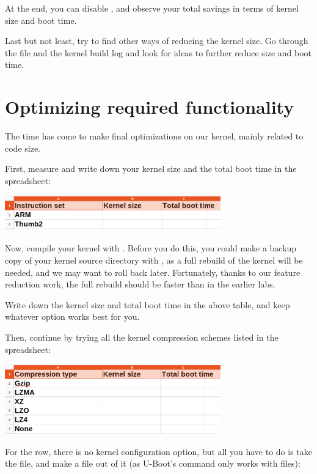 At the end, you can disable , and observe your
total savings in terms of kernel size and boot time.

Last but not least, try to find other ways of reducing the kernel size.
Go through the  file and the kernel build log and look for
ideas to further reduce size and boot time.

\section{Optimizing required functionality}

The time has come to make final optimizations on our kernel, mainly
related to code size.

First, measure and write down your kernel size and the total boot time
in the  spreadsheet:

\includegraphics[width=0.7\textwidth]{labs/boot-time-kernel/kernel-size-arm-thumb2.png}

Now, compile your kernel with . Before you do
this, you could make a backup copy of your kernel source directory with
, as a full rebuild of the kernel will be needed, and we
may want to roll back later. Fortunately, thanks to our feature
reduction work, the full rebuild should be faster than in the earlier labs.

Write down the kernel size and total boot time in the above table,
and keep whatever option works best for you.

Then, continue by trying all the kernel compression schemes listed in
the  spreadsheet:

\includegraphics[width=0.7\textwidth]{labs/boot-time-kernel/kernel-size-compression.png}

For the  row, there is no kernel configuration option, but
all you have to do is take the  file, and make a
 file out of it (as U-Boot's  command only
works with  files):

